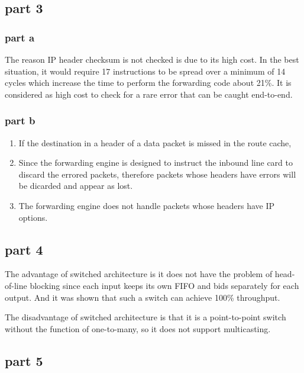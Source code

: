 \subsection{part 3}
\subsubsection{part a}
The reason IP header checksum is not checked is due to its high cost. In the best situation, it would require 17 instructions to be spread over a minimum of 14 cycles which increase the time to perform the forwarding code about 21\%. It is considered as high cost to check for a rare error that can be caught end-to-end.

\subsubsection{part b}
\begin{enumerate}
\item If the destination in a header of a data packet is missed in the route cache,
\item Since the forwarding engine is designed to instruct the inbound line card to discard the errored packets, therefore packets whose headers have errors will be dicarded and appear as lost.
\item The forwarding engine does not handle packets whose headers have IP options.
\
\end{enumerate}

\subsection{part 4}
The advantage of switched architecture is it does not have the problem of head-of-line blocking since each input keeps its own FIFO and bids separately for each output. And it was shown that such a switch can achieve 100\% throughput.

The disadvantage of switched architecture is that it is a point-to-point switch without the function of one-to-many, so it does not support multicasting.
\subsection{part 5}
